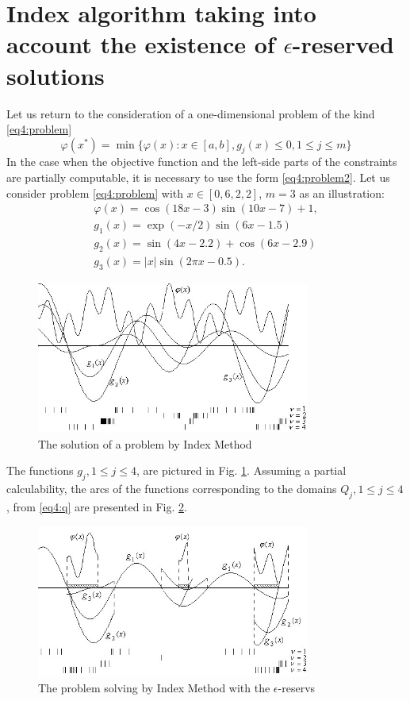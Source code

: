 \documentclass[graybox]{svmult}
\begin{document}
\section{Index algorithm taking into account the existence of $\epsilon$-reserved solutions}
Let us return to the consideration of a one-dimensional problem of the kind \eqref{eq4:problem}
\begin{displaymath}
  \varphi(x^*)=\min\{\varphi(x):x\in [a,b], g_j(x)\le 0,1\le j\le m\}
\end{displaymath}
In the case when the objective function and the left-side parts of the constraints are partially computable, it is necessary to use the form \eqref{eq4:problem2}.
\example
{
Let us consider problem \eqref{eq4:problem} with $x\in[0,6,2,2]$, $m=3$ as an illustration:
\begin{gather*}
\varphi(x)=\cos(18x-3)\sin(10x-7)+1, \\
g_1(x)=\exp(-x/2)\sin(6x-1.5) \\
g_2(x)=\sin(4x-2.2)+\cos(6x-2.9) \\
g_3(x)=|x|\sin(2\pi x - 0.5).
\end{gather*}
}
\begin{figure}[h]
  \label{fig:4_7}
  \centering
  \includegraphics[width=0.8\textwidth]{figures/4_7.jpg}
  \caption{The solution of a problem by Index Method}
\end{figure}
The functions $g_j , 1\le j\le 4$, are pictured in Fig. \ref{fig:4_7}. Assuming a partial calculability, the arcs of
the functions corresponding to the domains $Q_j ,1\le j\le 4$, from \eqref{eq4:q} are presented in Fig. \ref{fig:4_8}.

\begin{figure}[h]
  \label{fig:4_8}
  \centering
  \includegraphics[width=0.8\textwidth]{figures/4_8.jpg}
  \caption{The problem solving by Index Method with the $\epsilon$-reservs}
\end{figure}
\end{document}
